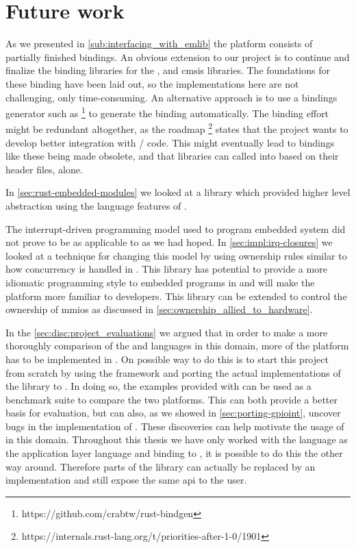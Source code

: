 \section{Future work}
\label{chap:future}

As we presented in \autoref{sub:interfacing_with_emlib} the platform consists of partially finished bindings.
An obvious extension to our project is to continue and finalize the binding libraries for the {\emlib}, {\emdrv} and \gls{cmsis} libraries.
The foundations for these binding have been laid out, so the implementations here are not challenging, only time-consuming.
An alternative approach is to use a bindings generator such as  \footnote{https://github.com/crabtw/rust-bindgen} to generate the binding automatically.
The binding effort might be redundant altogether, as the {\rust} roadmap \footnote{https://internals.rust-lang.org/t/priorities-after-1-0/1901} states that the project wants to develop better integration with {\C}/{\Cpp} code.
This might eventually lead to bindings like these being made obsolete, and that {\C} libraries can called into based on their header files, alone.

In \autoref{sec:rust-embedded-modules} we looked at a library which provided higher level abstraction using the language features of {\rust}.

The interrupt-driven programming model used to program embedded system did not prove to be as applicable to {\rust} as we had hoped.
In \autoref{sec:impl:irq-closures} we looked at a technique for changing this model by using ownership rules similar to how concurrency is handled in {\rust}.
This library has potential to provide a more idiomatic programming style to embedded programs in {\rust} and will make the platform more familiar to {\rust} developers.
This library can be extended to control the ownership of \glspl{mmio} as discussed in \autoref{sec:ownership_allied_to_hardware}.

In the \autoref{sec:disc:project_evaluations} we argued that in order to make a more thoroughly comparison of the {\C} and {\rust} languages in this domain, more of the platform has to be implemented in {\rust}.
On possible way to do this is to start this project from scratch by using the  framework and porting the actual implementations of the {\emlib} library to {\rust}.
In doing so, the examples provided with {\emlib} can be used as a benchmark suite to compare the two platforms.
This can both provide a better basis for evaluation, but can also, as we showed in \autoref{sec:porting-gpioint}, uncover bugs in the {\C} implementation of {\emlib}.
These discoveries can help motivate the usage of {\rust} in this domain.
Throughout this thesis we have only worked with the {\rust} language as the application layer language and binding to {\C}, it is possible to do this the other way around.
Therefore parts of the {\emlib} library can actually be replaced by an {\rust} implementation and still expose the same \gls{api} to the user.
